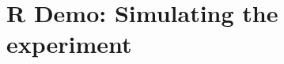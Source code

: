 \documentclass[slidestop,compress,mathserif]{beamer}
\makeatletter
\def\chpii@path{../../../Chp 2}
\makeatother
\begin{document}
\section{R Demo: Simulating the experiment}













\end{document}
